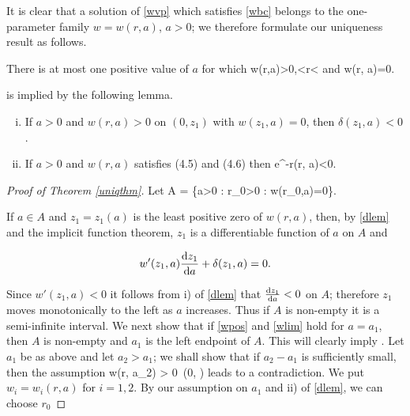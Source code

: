 It is clear that a solution of \eqref{wvp} which satisfies
\eqref{wbc} belongs to the one-parameter family $w=w(r, a)$, $a>0$; we
therefore formulate our uniqueness result as follows.

\begin{theorem}\label{uniqthm}
    There is at most one positive value of $a$ for which
    \be\label{wpos} w(r,a)>0,<r<\infty\ee
    and
    \be\label{wlim} w(r, a)=0.\ee
\end{theorem}

 is implied by the following lemma.

\begin{lemma}
    \begin{enumerate}[(i)]
        \item If $a>0$ and $w(r, a)>0$ on $(0, z_1)$ with $w(z_1, a)=0$, then
            $\delta(z_1, a)<0$.
        \item If $a>0$ and $w(r, a)$ satisfies (4.5) and (4.6) then
            \be\label{dlim}
                 e^{-r}\delta(r, a)<0.
            \ee
    \end{enumerate}
\end{lemma}

\begin{proof}[Proof of Theorem \ref{uniqthm}]
    Let
    \be\label{adef}
    A = \left\{a>0 : \exists r_0>0 : w(r_0,a)=0\right\}.
    \ee
    
    If $a\in A$ and $z_1=z_1(a)$ is the least positive zero of $w(r,a)$, then,
    by \cref{dlem} and the implicit function theorem, $z_1$ is a differentiable
    function of $a$ on $A$ and

    $$w'(z_1, a)\frac{\mathop{}\!\mathrm{d} z_1}{\mathop{}\!\mathrm{d} a} + \delta(z_1, a) = 0.$$

    Since $w'(z_1, a)<0$ it follows from i) of \cref{dlem} that $\frac{\mathop{}\!\mathrm{d}
    z_1}{\mathop{}\!\mathrm{d} a}<0$ on $A$; therefore $z_1$ moves monotonically to the left as
    $a$ increases. Thus if $A$ is non-empty it is a semi-infinite interval. We
    next show that if \eqref{wpos} and \eqref{wlim} hold for $a=a_1$, then $A$
    is non-empty and $a_1$ is the left endpoint of $A$. This will clearly imply
    . Let $a_1$ be as above and let $a_2>a_1$; we shall show that
    if $a_2-a_1$ is sufficiently small, then the assumption
    \be\label{wass} w(r, a_2) > 0\quad{}~(0, \infty)\ee
    leads to a contradiction. We put $w_i=w_i(r, a)$ for $i=1, 2$. By our
    assumption on $a_1$ and ii) of \cref{dlem}, we can choose $r_0$

\end{proof}


